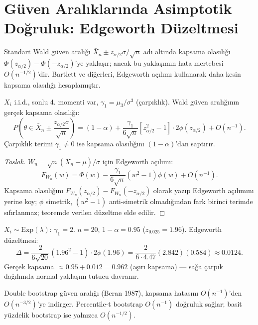 \section{Güven Aralıklarında Asimptotik Doğruluk: Edgeworth Düzeltmesi}
\label{sec:edgeworth_ga}

Standart Wald güven aralığı $\bar X_n \pm z_{\alpha/2}\sigma/\sqrt{n}$ adı altında kapsama olasılığı $\Phi(z_{\alpha/2})-\Phi(-z_{\alpha/2})$'ye yaklaşır; ancak bu yaklaşımın hata mertebesi $O(n^{-1/2})$'dir. Bartlett ve diğerleri, Edgeworth açılımı kullanarak daha kesin kapsama olasılığı hesaplamıştır.

\begin{teorem}\label{thm:edgeworth_ga}
$X_i$ i.i.d., sonlu 4. momenti var, $\gamma_1=\mu_3/\sigma^3$ (çarpıklık). Wald güven aralığının gerçek kapsama olasılığı:
\[
  P\!\left(\theta\in\bar X_n\pm\frac{z_{\alpha/2}\sigma}{\sqrt{n}}\right)
  = (1-\alpha) + \frac{\gamma_1}{6\sqrt{n}}[z_{\alpha/2}^2-1]\cdot2\phi(z_{\alpha/2}) + O(n^{-1}).
\]
Çarpıklık terimi $\gamma_1\neq0$ ise kapsama olasılığını $(1-\alpha)$'dan saptırır.
\end{teorem}

\begin{proof}[Taslak]
$W_n=\sqrt{n}(\bar X_n-\mu)/\sigma$ için Edgeworth açılımı:
\[
  F_{W_n}(w) = \Phi(w) - \frac{\gamma_1}{6\sqrt{n}}(w^2-1)\phi(w) + O(n^{-1}).
\]
Kapsama olasılığını $F_{W_n}(z_{\alpha/2})-F_{W_n}(-z_{\alpha/2})$ olarak yazıp Edgeworth açılımını yerine koy; $\phi$ simetrik, $(w^2-1)$ anti-simetrik olmadığından fark birinci terimde sıfırlanmaz; teoremde verilen düzeltme elde edilir.
\end{proof}

\begin{ornek}
$X_i\sim\mathrm{Exp}(\lambda)$: $\gamma_1=2$. $n=20$, $1-\alpha=0.95$ ($z_{0.025}=1.96$).
Edgeworth düzeltmesi:
\[
  \Delta = \frac{2}{6\sqrt{20}}(1.96^2-1)\cdot2\phi(1.96) = \frac{2}{6\cdot4.47}(2.842)(0.584)\approx0.0124.
\]
Gerçek kapsama $\approx0.95+0.012=0.962$ (aşırı kapsama) --- sağa çarpık dağılımda normal yaklaşım tutucu davranır.
\end{ornek}

\begin{teorem}\label{thm:bootstrap_kapsama}
Double bootstrap güven aralığı (Beran 1987), kapsama hatasını $O(n^{-1})$'den $O(n^{-3/2})$'ye indirger. Percentile-t bootstrap $O(n^{-1})$ doğruluk sağlar; basit yüzdelik bootstrap ise yalnızca $O(n^{-1/2})$.
\end{teorem}

